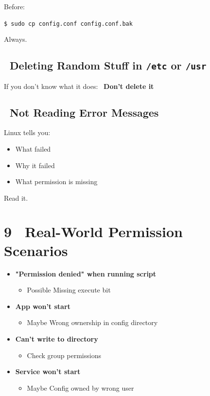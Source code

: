 \documentclass[12pt]{article}
\newcommand{\warningicon}{\faExclamationTriangle}
\newcommand{\handicon}{\faHandPointRight}
\begin{document}
Before:

\begin{highlightbox}
\texttt{\$ sudo cp config.conf config.conf.bak}
\end{highlightbox}

Always.

\subsection*{\warningicon\ Deleting Random Stuff in \texttt{/etc} or \texttt{/usr}}

If you don't know what it does:
\handicon\ \textbf{Don't delete it}

\subsection*{\warningicon\ Not Reading Error Messages}

Linux tells you:

\begin{itemize}
    \item What failed
    \item Why it failed
    \item What permission is missing
\end{itemize}

Read it.

\section*{9 \handicon\ Real-World Permission Scenarios}

\begin{itemize}
    \item \textbf{"Permission denied" when running script}
    \begin{itemize}
        \item Possible Missing execute bit
    \end{itemize}
    
    \item \textbf{App won't start}
    \begin{itemize}
        \item Maybe Wrong ownership in config directory
    \end{itemize}
    
    \item \textbf{Can't write to directory}
    \begin{itemize}
        \item Check group permissions
    \end{itemize}
    
    \item \textbf{Service won't start}
    \begin{itemize}
        \item Maybe Config owned by wrong user
    \end{itemize}
\end{itemize}
\end{document}
